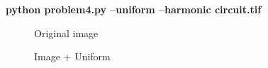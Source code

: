 \pagebreak
\begin{minipage}{\textwidth}
\textbf{python problem4.py --uniform --harmonic circuit.tif} \\
\end{minipage}

\begin{figure}[!htb]\centering
    \begin{minipage}{0.45\textwidth}
        \caption{\small{Original image}}
    \end{minipage}
    \begin{minipage}{0.45\textwidth}
        \caption{\small{Image + Uniform}}
    \end{minipage}
\end{figure}

